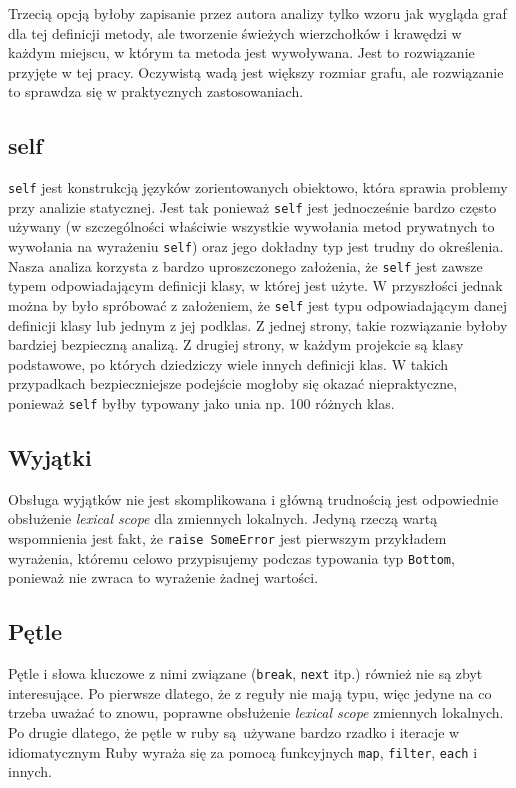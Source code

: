 \documentclass[declaration,shortabstract]{iithesis}
\begin{document}
Trzecią opcją byłoby zapisanie przez autora analizy tylko wzoru jak wygląda graf dla tej definicji metody, ale tworzenie świeżych wierzchołków i krawędzi w każdym miejscu, w którym ta metoda jest wywoływana. Jest to rozwiązanie przyjęte w tej pracy. Oczywistą wadą jest większy rozmiar grafu, ale rozwiązanie to sprawdza się w praktycznych zastosowaniach.

\subsection{self}

\texttt{self} jest konstrukcją języków zorientowanych obiektowo, która sprawia problemy przy analizie statycznej.
Jest tak ponieważ \texttt{self} jest jednocześnie bardzo często używany (w szczególności właściwie wszystkie wywołania metod prywatnych to wywołania na wyrażeniu \texttt{self}) oraz jego dokładny typ jest trudny do określenia. Nasza analiza korzysta z bardzo uproszczonego założenia, że \texttt{self} jest zawsze typem odpowiadającym definicji klasy, w której jest użyte. W przyszłości jednak można by było spróbować z założeniem, że \texttt{self} jest typu odpowiadającym danej definicji klasy lub jednym z jej podklas. Z jednej strony, takie rozwiązanie byłoby bardziej bezpieczną analizą. Z drugiej strony, w każdym projekcie są klasy podstawowe, po których dziedziczy wiele innych definicji klas. W takich przypadkach bezpieczniejsze podejście mogłoby się okazać niepraktyczne, ponieważ \texttt{self} byłby typowany jako unia np. 100 różnych klas.

\subsection{Wyjątki}

Obsługa wyjątków nie jest skomplikowana i główną trudnością jest odpowiednie obsłużenie \textit{lexical scope} dla zmiennych lokalnych. Jedyną rzeczą wartą wspomnienia jest fakt, że \texttt{raise SomeError} jest pierwszym przykładem wyrażenia, któremu celowo przypisujemy podczas typowania typ \texttt{Bottom}, ponieważ nie zwraca to wyrażenie żadnej wartości.

\subsection{Pętle}

Pętle i słowa kluczowe z nimi związane (\texttt{break}, \texttt{next} itp.) również nie są zbyt interesujące. Po pierwsze dlatego, że z reguły nie mają typu, więc jedyne na co trzeba uważać to znowu, poprawne obsłużenie \textit{lexical scope} zmiennych lokalnych. Po drugie dlatego, że pętle w ruby są używane bardzo rzadko i iteracje w idiomatycznym Ruby wyraża się za pomocą funkcyjnych \texttt{map}, \texttt{filter}, \texttt{each} i innych.
\end{document}
